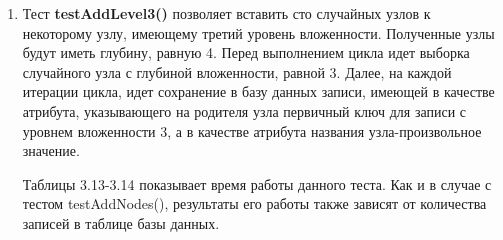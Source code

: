 \documentclass[a4paper,14pt]{extreport}
\theoremstyle{definition}
\begin{document}
\begin{enumerate}
\begin{table}[H]
\end{table}
\item Тест \textbf{testAddLevel3()} позволяет вставить сто случайных узлов к некоторому узлу, имеющему третий уровень вложенности. Полученные узлы будут иметь глубину, равную 4. Перед выполнением цикла идет выборка случайного узла с глубиной вложенности, равной 3. Далее, на каждой итерации цикла, идет сохранение в базу данных записи, имеющей в качестве атрибута, указывающего на родителя узла первичный ключ для записи с уровнем вложенности 3, а в качестве атрибута названия узла-произвольное значение.

Таблицы 3.13-3.14 показывает время работы данного теста. Как и в случае с тестом testAddNodes(), результаты его работы также зависят от количества записей в таблице базы данных.
\begin{table}[H]
\end{table}


\end{enumerate}
\end{document}
